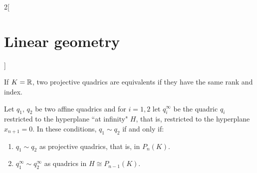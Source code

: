 \documentclass[../../../main.tex]{subfiles}
\begin{document}
\begin{multicols}{2}[\section{Linear geometry}]
  \begin{theorem}
    If $K=\mathbb{R} $, two projective quadrics are equivalents if they have the same rank and index.
  \end{theorem}
  \begin{theorem}
    Let $q_1$, $q_2$ be two affine quadrics and for $i=1,2$ let $q_i^\infty$ be the quadric $q_i$ restricted to the hyperplane ``at infinity" $H$, that is, restricted to the hyperplane $x_{n+1}=0$. In these conditions, $q_1\sim q_2$ if and only if:
    \begin{enumerate}
      \item $q_1\sim q_2$ as projective quadrics, that is, in $P_n(K)$.
      \item $q_1^\infty\sim q_2^\infty$ as quadrics in $H\cong P_{n-1}(K)$.
    \end{enumerate}
  \end{theorem}
\end{multicols}
\end{document}
